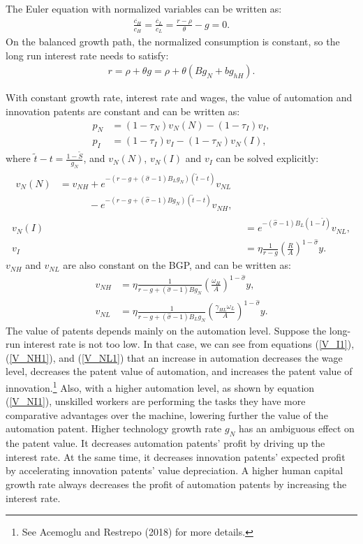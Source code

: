 \documentclass[12pt]{article}
\begin{document}
The Euler equation with normalized variables can be written as: 
\begin{align*}
\frac{\dot{c_H}}{c_H} = \frac{\dot{c_L}}{c_L} = \frac{r-\rho}{\theta}-g = 0.
\end{align*}
On the balanced growth path, the normalized consumption is constant, so the long run interest rate needs to satisfy: 
\begin{align}
\label{LRR}
r = \rho+\theta g = \rho+\theta(Bg_N+bg_{hH}).
\end{align}

With constant growth rate, interest rate and wages, the value of automation and innovation patents are constant and can be written as: 
\begin{align}
p_N &= (1-\tau_N)v_N(N)-(1-\tau_I)v_I,\\
p_I &= (1-\tau_I)v_I-(1-\tau_N)v_N(I), 
\end{align}
where $\tilde{t}-t =\frac{1-\tilde{S}}{g_N}$, and $v_N(N)$, $v_N(I)$ and $v_I$ can be solved explicitly: 
\begin{align}
\label{V_NN1}
\begin{split}
v_N(N) &= v_{NH}+e^{-(r-g+(\hat{\sigma}-1)B_Lg_N)(\tilde{t}-t)}v_{NL} \\
&\quad \quad \quad -e^{-(r-g+(\hat{\sigma}-1)Bg_N)(\tilde{t}-t)}v_{NH},
\end{split} \\
\label{V_NI1} 
v_N(I) &=e^{-(\hat{\sigma}-1)B_L(1-\tilde{I})}v_{NL}, \\
\label{V_I1}
v_I &= \eta\frac{1}{r-g}(\frac{R}{A})^{1-\hat{\sigma}}y.
\end{align}
$v_{NH}$ and $v_{NL}$ are also constant on the BGP, and can be written as: 
\begin{align}
\label{V_NH1} 
v_{NH} &= \eta\frac{1}{r-g+(\hat{\sigma}-1)Bg_N}(\frac{\omega_H}{A})^{1-\hat{\sigma}}y, \\
\label{V_NL1} 
v_{NL} &=\eta \frac{1}{r-g+(\hat{\sigma}-1)B_Lg_N}(\frac{\gamma_{HL}\omega_L}{A})^{1-\hat{\sigma}}y.
\end{align}
The value of patents depends mainly on the automation level. Suppose the long-run interest rate is not too low. In that case, we can see from equations (\ref{V_I1}), (\ref{V_NH1}), and (\ref{V_NL1}) that an increase in automation decreases the wage level, decreases the patent value of automation, and increases the patent value of innovation.\footnote{See Acemoglu and Restrepo (2018)\nocite{AcemogluRestrepo2018} for more details.} Also, with a higher automation level, as shown by equation (\ref{V_NI1}), unskilled workers are performing the tasks they have more comparative advantages over the machine, lowering further the value of the automation patent. Higher technology growth rate $g_N$ has an ambiguous effect on the patent value. It decreases automation patents' profit by driving up the interest rate. At the same time, it decreases innovation patents' expected profit by accelerating innovation patents' value depreciation. A higher human capital growth rate always decreases the profit of automation patents by increasing the interest rate. 
\end{document}
